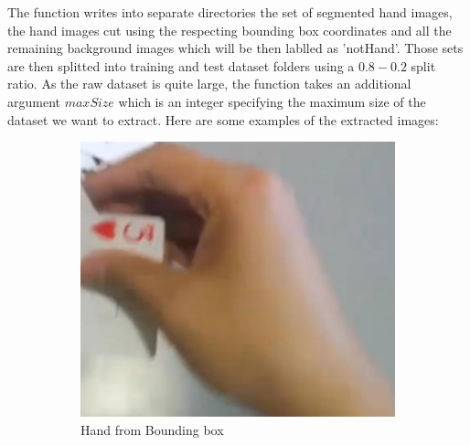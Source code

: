 The function writes into separate directories the set of segmented hand images,
the hand images cut using the respecting bounding box coordinates and all the
remaining background images
which will be then lablled as 'notHand'. Those sets are then splitted into
training and test dataset folders using a $0.8-0.2$ split ratio. As the raw
dataset is quite large, the function takes
an additional argument $maxSize$ which is an integer specifying the maximum
size of the dataset we want to extract. Here are some examples of the extracted
images:

\begin{figure}
    \centering
    \begin{subfigure}[b]{0.3 \textwidth}
        \centering
        \includegraphics[width=\textwidth]{images/hand/2170.jpg}
        \caption{Hand from Bounding box}
        \label{fig:handBoundeed}
    \end{subfigure}
    \hfill
    \begin{subfigure}[b]{0.3\textwidth}
        \centering

\end{subfigure}
\end{figure}
